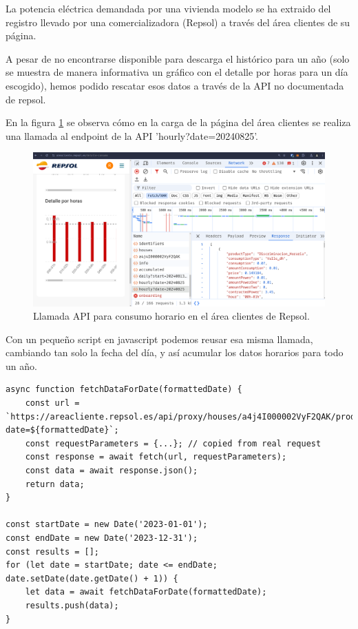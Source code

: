 La potencia eléctrica demandada por una vivienda modelo se ha extraido
del registro llevado por una comercializadora (Repsol) a través del área
clientes de su página.

A pesar de no encontrarse disponible para descarga el histórico para un año
(solo se muestra de manera informativa un gráfico con el detalle por horas para
un día escogido), hemos podido rescatar esos datos a través de la API no
documentada de repsol.

En la figura \ref{fig:repsol_api} se observa cómo en la carga de la página del
área clientes se realiza una llamada al endpoint de la API
'hourly?date=20240825'.

\begin{figure}[h] \centering
	\centering
	\includegraphics[width=1\textwidth]{./capitulos/adquisicion_de_datos/images/repsol_api.png}
	\caption{Llamada API para consumo horario en el área clientes de Repsol.}
	\label{fig:repsol_api}
\end{figure}

Con un pequeño script en javascript podemos reusar esa misma llamada, cambiando
tan solo la fecha del día, y así acumular los datos horarios para todo un año.

\begin{verbatim}
async function fetchDataForDate(formattedDate) {
    const url = `https://areacliente.repsol.es/api/proxy/houses/a4j4I000002VyF2QAK/products/4302580717/consumption/hourly?date=${formattedDate}`;
    const requestParameters = {...}; // copied from real request
    const response = await fetch(url, requestParameters);
    const data = await response.json();
    return data;
}

const startDate = new Date('2023-01-01');
const endDate = new Date('2023-12-31');
const results = [];
for (let date = startDate; date <= endDate; date.setDate(date.getDate() + 1)) {
    let data = await fetchDataForDate(formattedDate);
    results.push(data);
}
\end{verbatim}


